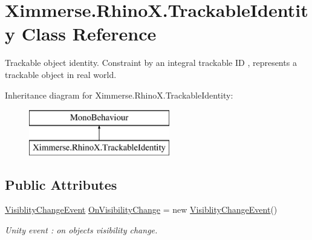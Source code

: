\hypertarget{class_ximmerse_1_1_rhino_x_1_1_trackable_identity}{}\section{Ximmerse.\+Rhino\+X.\+Trackable\+Identity Class Reference}
\label{class_ximmerse_1_1_rhino_x_1_1_trackable_identity}


Trackable object identity. Constraint by an integral trackable ID , represents a trackable object in real world.  


Inheritance diagram for Ximmerse.\+Rhino\+X.\+Trackable\+Identity\+:\begin{figure}[H]
\begin{center}
\leavevmode
\includegraphics[height=2.000000cm]{class_ximmerse_1_1_rhino_x_1_1_trackable_identity}
\end{center}
\end{figure}
\subsection*{Public Attributes}
\begin{DoxyCompactItemize}
\item 
\mbox{\hyperlink{class_ximmerse_1_1_rhino_x_1_1_visiblity_change_event}{Visiblity\+Change\+Event}} \mbox{\hyperlink{class_ximmerse_1_1_rhino_x_1_1_trackable_identity_a586dc1b3013620e375e7887485b5ae13}{On\+Visibility\+Change}} = new \mbox{\hyperlink{class_ximmerse_1_1_rhino_x_1_1_visiblity_change_event}{Visiblity\+Change\+Event}}()
\begin{DoxyCompactList}\small\item\em Unity event \+: on object\textquotesingle{}s visibility change. \end{DoxyCompactList}\end{DoxyCompactItemize}
